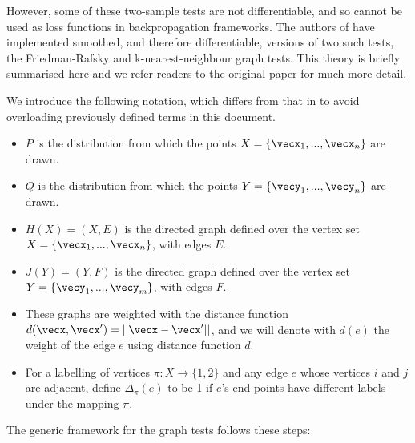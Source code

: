 However, some of these two-sample tests are not differentiable, and so cannot be used as loss functions in backpropagation frameworks. The authors of \cite{torchtwosample} have implemented smoothed, and therefore differentiable, versions of two such tests, the Friedman-Rafsky and k-nearest-neighbour graph tests. This theory is briefly summarised here and we refer readers to the original paper for much more detail. 

We introduce the following notation, which differs from that in \cite{torchtwosample} to avoid overloading previously defined terms in this document. 

\begin{itemize}
    \item $P$ is the distribution from which the points $X = \{\vecx_1, ..., \vecx_n \}$ are drawn.
    \item $Q$ is the distribution from which the points $Y = \{\vecy_1, ..., \vecy_n \}$ are drawn.
    \item $H(X) = (X, E)$ is the directed graph defined over the vertex set $X = \{\vecx_1, ..., \vecx_n \}$, with edges $E$.
    \item $J(Y) = (Y, F) $ is the directed graph defined over the vertex set $Y = \{\vecy_1, ..., \vecy_m \}$, with edges $F$. 
    \item These graphs are weighted with the distance function $d(\vecx, \vecx') = || \vecx - \vecx'||$, and we will denote with $d(e)$ the weight of the edge $e$ using distance function $d$. 
    \item For a labelling of vertices $\pi: X \rightarrow \{1, 2\}$ and any edge $e$ whose vertices $i$ and $j$ are adjacent, define $\Delta_{\pi}(e)$ to be 1 if $e$'s end points have different labels under the mapping $\pi$. 
\end{itemize}

The generic framework for the graph tests follows these steps:

